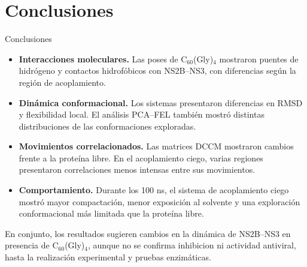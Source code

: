 \documentclass{beamer}
\begin{document}













\section{Conclusiones}
\begin{frame}{Conclusiones}
\small
\begin{itemize}
\setlength{\itemsep}{0.65em}
\justifying
\item \textbf{Interacciones moleculares.} Las poses de C$_{60}$(Gly)$_4$ mostraron puentes de hidrógeno y contactos hidrofóbicos con NS2B--NS3, con diferencias según la región de acoplamiento.
\item \textbf{Dinámica conformacional.} Los sistemas presentaron diferencias en RMSD y flexibilidad local. El análisis PCA--FEL también mostró distintas distribuciones de las conformaciones exploradas.
\item \textbf{Movimientos correlacionados.} Las matrices DCCM mostraron cambios frente a la proteína libre. En el acoplamiento ciego, varias regiones presentaron correlaciones menos intensas entre sus movimientos.
\item \textbf{Comportamiento.} Durante los 100 ns, el sistema de acoplamiento ciego mostró mayor compactación, menor exposición al solvente y una exploración conformacional más limitada que la proteína libre.
\end{itemize}
\vspace{0.4em}
\footnotesize\justifying
En conjunto, los resultados sugieren cambios en la dinámica de NS2B--NS3 en presencia de C$_{60}$(Gly)$_4$, aunque no se confirma inhibicion ni actividad antiviral, hasta la realización experimental y pruebas enzimáticas.
\end{frame}
\end{document}
